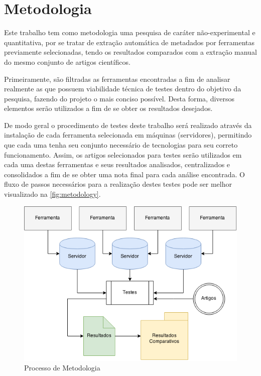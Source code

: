 
\chapter{Metodologia}
\label{cha:metodology}

Este trabalho tem como metodologia uma pesquisa de caráter não-experimental e quantitativa, por se tratar de extração automática de metadados por ferramentas previamente selecionadas, tendo os resultados comparados com a extração manual do mesmo conjunto de artigos científicos.


Primeiramente, são filtradas as ferramentas encontradas a fim de analisar realmente as que possuem viabilidade técnica de testes dentro do objetivo da pesquisa, fazendo do projeto o mais conciso possível. Desta forma, diversos elementos serão utilizados a fim de se obter os resultados desejados.


De modo geral o procedimento de testes deste trabalho será realizado através da instalação de cada ferramenta selecionada em máquinas (servidores), permitindo que cada uma tenha seu conjunto necessário de tecnologias para seu correto funcionamento. Assim, os artigos selecionados para testes serão utilizados em cada uma destas ferramentas e seus resultados analisados, centralizados e consolidados a fim de se obter uma nota final para cada análise encontrada. O fluxo de passos necessários para a realização destes testes pode ser melhor visualizado na \autoref{fig:metodology}.

\begin{figure}
    \centering
    \caption{Processo de Metodologia}
    \label{fig:metodology}
    \includegraphics[width=0.8\linewidth]{./assets/images/metodology}
\end{figure}


